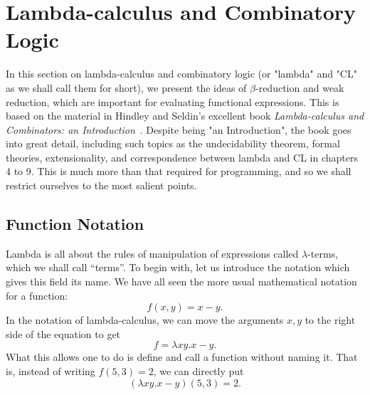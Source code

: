 \section{Lambda-calculus and Combinatory Logic}
\newcommand\reduce{\ \triangleright\ }

In this section on lambda-calculus and combinatory logic (or "lambda" and "CL" as we shall call them for short), we present the ideas of $\beta$-reduction and weak reduction, which are important for evaluating functional expressions. This is based on the material in Hindley and Seldin's excellent book {\it Lambda-calculus and Combinators: an Introduction}~\cite{LambdaAndCombinatorsIntro}. Despite being "an Introduction", the book goes into great detail, including such topics as the undecidability theorem, formal theories, extensionality, and correspondence between lambda and CL in chapters 4 to 9. This is much more than that required for programming, and so we shall restrict ourselves to the most salient points.

\subsection{Function Notation}
Lambda is all about the rules of manipulation of expressions called $\lambda$-terms, which we shall call ``terms''.
To begin with, let us introduce the notation which gives this field its name. We have all seen the more usual mathematical notation for a function:
\begin{equation*}
    f(x,y) = x-y.
\end{equation*}
In the notation of lambda-calculus, we can move the arguments $x,y$ to the right side of the equation to get
\begin{equation*}
    f = \lambda xy.x-y.
\end{equation*}
What this allows one to do is define and call a function without naming it. That is, instead of writing $f(5,3) = 2$, we can directly put
\begin{equation}
    (\lambda xy.x-y)(5,3) = 2.
\end{equation}

